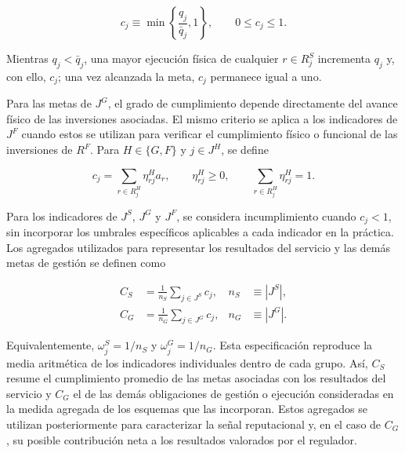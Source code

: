 \begin{equation}
\label{eq:cumplimiento_s}
c_j
\equiv
\min
\left\{
\frac{q_j}{\bar q_j},
1
\right\},
\qquad
0\leq c_j\leq1.
\end{equation}

Mientras \(q_j<\bar q_j\), una mayor ejecución física de cualquier \(r\in R_j^{S}\) incrementa \(q_j\) y, con ello, \(c_j\); una vez alcanzada la meta, \(c_j\) permanece igual a uno.

Para las metas de \(J^{G}\), el grado de cumplimiento depende directamente del avance físico de las inversiones asociadas. El mismo criterio se aplica a los indicadores de \(J^{F}\) cuando estos se utilizan para verificar el cumplimiento físico o funcional de las inversiones de \(R^{F}\). Para \(H\in\{G,F\}\) y \(j\in J^{H}\), se define

\begin{equation}
\label{eq:cumplimiento_g_f}
c_j
=
\sum_{r\in R_j^{H}}
\eta_{rj}^{H}a_r,
\qquad
\eta_{rj}^{H}\geq0,
\qquad
\sum_{r\in R_j^{H}}\eta_{rj}^{H}=1.
\end{equation}

Para los indicadores de \(J^{S}\), \(J^{G}\) y \(J^{F}\), se considera incumplimiento cuando \(c_j<1\), sin incorporar los umbrales específicos aplicables a cada indicador en la práctica. Los agregados utilizados para representar los resultados del servicio y las demás metas de gestión se definen como

\begin{equation}
\label{eq:agregados_cumplimiento}
\begin{aligned}
C_S
&=
\frac{1}{n_S}
\sum_{j\in J^{S}}c_j,
&
n_S
&\equiv
|J^{S}|,
\\
C_G
&=
\frac{1}{n_G}
\sum_{j\in J^{G}}c_j,
&
n_G
&\equiv
|J^{G}|.
\end{aligned}
\end{equation}

Equivalentemente, \(\omega_j^{S}=1/n_S\) y \(\omega_j^{G}=1/n_G\). Esta especificación reproduce la media aritmética de los indicadores individuales dentro de cada grupo. Así, \(C_S\) resume el cumplimiento promedio de las metas asociadas con los resultados del servicio y \(C_G\) el de las demás obligaciones de gestión o ejecución consideradas en la medida agregada de los esquemas que las incorporan. Estos agregados se utilizan posteriormente para caracterizar la señal reputacional y, en el caso de \(C_G\), su posible contribución neta a los resultados valorados por el regulador.


